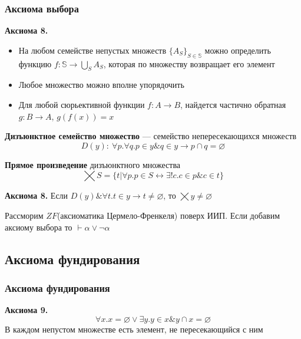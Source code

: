 \documentclass[english]{article}
\begin{document}
\subsubsection{Аксиома выбора}
\label{sec:org7721ee5}
\begin{axiom*}{\bf Аксиома 8.}
	\begin{itemize}
		\item На любом семействе непустых множеств \(\{A_S\}_{S \in \mathbb{S}}\) можно определить функцию \(f: \mathbb{S} \to \bigcup_{S}A_S\), которая по множеству возвращает его элемент
		\item Любое множество можно вполне упорядочить
		\item Для любой сюрьективной функции \(f: A \to B\), найдется частично обратная \(g: B \to A\), \(g(f(x)) = x\)
	\end{itemize}
\end{axiom*}
\begin{definition}
	\textbf{Дизъюнктное семейство множество} --- семейство непересекающихся множеств
	\[ D(y):\ \forall p.\forall q. p \in y \& q \in y \to p \cap q = \varnothing \]
\end{definition}
\begin{definition}
	\textbf{Прямое произведение} дизъюнктного множества
	\[ \bigtimes S = \{t \big| \forall p. p \in S \leftrightarrow \exists ! c. c \in p \& c \in t\} \]
\end{definition}
\begin{axiom*}{\bf Аксиома 8.}
	Если \(D(y)\& \forall t. t \in y \to t \neq \varnothing\), то \(\bigtimes y \neq \varnothing\)
	\label{org48573a9}
\end{axiom*}
\begin{theorem}[Диаконеску]
	Рассморим \(ZF\)(аксиоматика Цермело-Френкеля) поверх ИИП. Если добавим аксиому выбора то \(\vdash \alpha \lor \lnot \alpha\)
	\label{org4e06a34}
\end{theorem}
\subsection{Аксиома фундирования}
\label{sec:org21bf81f}
\subsubsection{Аксиома фундирования}
\label{sec:org778e564}
\begin{axiom*}{\bf Аксиома 9.}
	\[ \forall x. x = \varnothing \lor \exists y. y \in x \& y \cap x = \varnothing \]
	В каждом непустом множестве есть элемент, не пересекающийся с ним
\end{axiom*}
\end{document}
